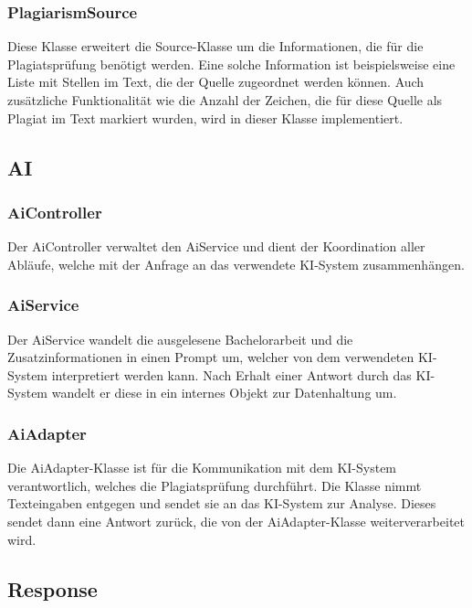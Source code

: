 \subsubsection{PlagiarismSource}\label{subsubsec:plagiarism_source}
Diese Klasse erweitert die Source-Klasse um die Informationen, die für die Plagiatsprüfung benötigt werden.
Eine solche Information ist beispielsweise eine Liste mit Stellen im Text, die der Quelle zugeordnet werden können.
Auch zusätzliche Funktionalität wie die Anzahl der Zeichen, die für diese Quelle als Plagiat im Text markiert wurden,
wird in dieser Klasse implementiert.

\subsection{AI}\label{subsec:ai}

\subsubsection{AiController}\label{subsubsec:ai_controller}
Der AiController verwaltet den AiService und dient der Koordination aller Abläufe,
welche mit der Anfrage an das verwendete KI-System zusammenhängen.

\subsubsection{AiService}\label{subsubsec:ai_service}
Der AiService wandelt die ausgelesene Bachelorarbeit und die Zusatzinformationen in einen Prompt um,
welcher von dem verwendeten KI-System interpretiert werden kann.
Nach Erhalt einer Antwort durch das KI-System wandelt er diese in ein internes Objekt zur Datenhaltung um.

\subsubsection{AiAdapter}\label{subsubsec:ai_adapter}
Die AiAdapter-Klasse ist für die Kommunikation mit dem KI-System verantwortlich, welches die Plagiatsprüfung durchführt.
Die Klasse nimmt Texteingaben entgegen und sendet sie an das KI-System zur Analyse.
Dieses sendet dann eine Antwort zurück, die von der AiAdapter-Klasse weiterverarbeitet wird.

\subsection{Response}\label{subsec:response}


